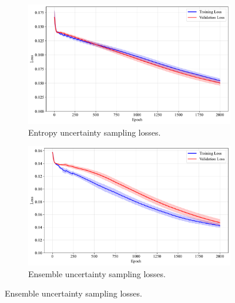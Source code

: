 \documentclass[10pt, conference]{IEEEtran}
\begin{document}
\begin{figure}[!t]
	\begin{subfigure}{\linewidth}
		\centering
		\includegraphics[width=\linewidth]{../results/wine/us_losses.pdf}
		\caption{Entropy uncertainty sampling losses.}
		\label{fig:us_losses_wine}
	\end{subfigure}
	
	\vspace{0.1em}
	
	\begin{subfigure}{\linewidth}
		\centering
		\includegraphics[width=\linewidth]{../results/wine/ensemble_us_losses.pdf}
		\caption{Ensemble uncertainty sampling losses.}
		\label{fig:ensemble_us_losses_wine}
	\end{subfigure}
\end{figure}
\end{document}
